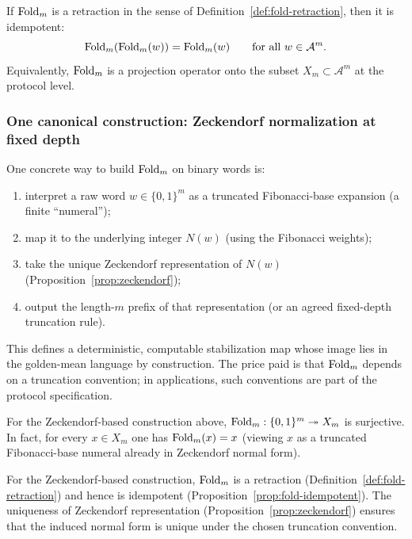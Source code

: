 \begin{proposition}\label{prop:fold-idempotent}
If $\mathrm{Fold}_m$ is a retraction in the sense of Definition~\ref{def:fold-retraction}, then it is idempotent:
\[
\mathrm{Fold}_m(\mathrm{Fold}_m(w))=\mathrm{Fold}_m(w)\qquad\text{for all }w\in\mathcal{A}^m.
\]
Equivalently, $\mathrm{Fold}_m$ is a projection operator onto the subset $X_m\subset\mathcal{A}^m$ at the protocol level.
\end{proposition}

\subsubsection{One canonical construction: Zeckendorf normalization at fixed depth}

One concrete way to build $\mathrm{Fold}_m$ on binary words is:
\begin{enumerate}[label=(\roman*),leftmargin=*,itemsep=2pt]
  \item interpret a raw word $w\in\{0,1\}^m$ as a truncated Fibonacci-base expansion (a finite ``numeral'');
  \item map it to the underlying integer $N(w)$ (using the Fibonacci weights);
  \item take the unique Zeckendorf representation of $N(w)$ (Proposition~\ref{prop:zeckendorf});
  \item output the length-$m$ prefix of that representation (or an agreed fixed-depth truncation rule).
\end{enumerate}
This defines a deterministic, computable stabilization map whose image lies in the golden-mean language by construction. The price paid is that $\mathrm{Fold}_m$ depends on a truncation convention; in applications, such conventions are part of the protocol specification.

\begin{proposition}\label{prop:fold-surjective}
For the Zeckendorf-based construction above, $\mathrm{Fold}_m:\{0,1\}^m\twoheadrightarrow X_m$ is surjective. In fact, for every $x\in X_m$ one has $\mathrm{Fold}_m(x)=x$ (viewing $x$ as a truncated Fibonacci-base numeral already in Zeckendorf normal form).
\end{proposition}

\begin{corollary}\label{cor:fold-zeckendorf-retraction}
For the Zeckendorf-based construction, $\mathrm{Fold}_m$ is a retraction (Definition~\ref{def:fold-retraction}) and hence is idempotent (Proposition~\ref{prop:fold-idempotent}). The uniqueness of Zeckendorf representation (Proposition~\ref{prop:zeckendorf}) ensures that the induced normal form is unique under the chosen truncation convention.
\end{corollary}

